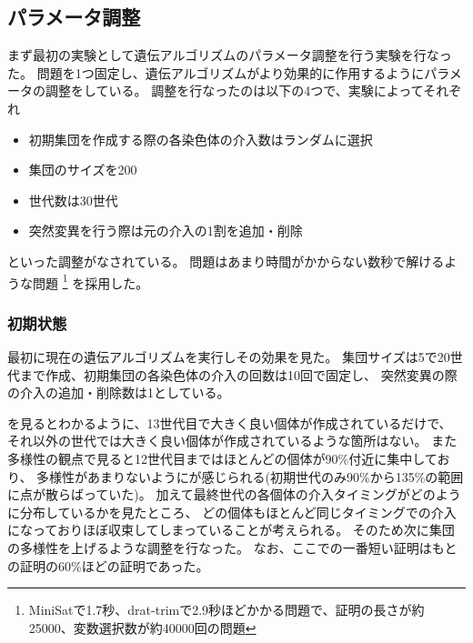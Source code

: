 \subsection{パラメータ調整}%



まず最初の実験として遺伝アルゴリズムのパラメータ調整を行う実験を行なった。
問題を1つ固定し、遺伝アルゴリズムがより効果的に作用するようにパラメータの調整をしている。
調整を行なったのは以下の4つで、実験によってそれぞれ
\begin{itemize}
    \item 初期集団を作成する際の各染色体の介入数はランダムに選択
    \item 集団のサイズを200
    \item 世代数は30世代
    \item 突然変異を行う際は元の介入の1割を追加・削除
\end{itemize}
といった調整がなされている。
問題はあまり時間がかからない数秒で解けるような問題
\footnote{MiniSatで1.7秒、drat-trimで2.9秒ほどかかる問題で、証明の長さが約25000、変数選択数が約40000回の問題}
を採用した。




\subsubsection{初期状態}

最初に現在の遺伝アルゴリズムを実行しその効果を見た。
集団サイズは5で20世代まで作成、初期集団の各染色体の介入の回数は10回で固定し、
突然変異の際の介入の追加・削除数は1としている。


を見るとわかるように、13世代目で大きく良い個体が作成されているだけで、
それ以外の世代では大きく良い個体が作成されているような箇所はない。
また多様性の観点で見ると12世代目まではほとんどの個体が90\%付近に集中しており、
多様性があまりないようにが感じられる(初期世代のみ90\%から135\%の範囲に点が散らばっていた)。
加えて最終世代の各個体の介入タイミングがどのように分布しているかを見たところ、
どの個体もほとんど同じタイミングでの介入になっておりほぼ収束してしまっていることが考えられる。
そのため次に集団の多様性を上げるような調整を行なった。
なお、ここでの一番短い証明はもとの証明の60\%ほどの証明であった。



